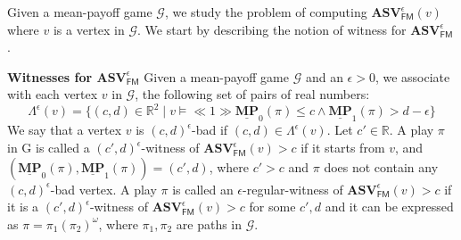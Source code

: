 Given a mean-payoff game $\mathcal{G}$, we study the problem of computing $\mathbf{ASV}^{\epsilon}_{\mathsf{FM}}(v)$ where $v$ is a vertex in $\mathcal{G}$. We start by describing the notion of witness for $\mathbf{ASV}^{\epsilon}_{\mathsf{FM}}$.

\noindent\textbf{Witnesses for $\mathbf{ASV}^{\epsilon}_{\mathsf{FM}}$} Given a mean-payoff game $\mathcal{G}$ and an $\epsilon > 0$, we associate with each vertex $v$ in $\mathcal{G}$, the following set of pairs of real numbers:
\begin{equation*}
\Lambda^{\epsilon}(v) = \{(c,d) \in \mathbb{R}^2 \mid v \models \ll 1 \gg \underline{\mathbf{MP}}_0(\pi) \leqslant c \land \underline{\mathbf{MP}}_1(\pi) > d-\epsilon \}
\end{equation*}
We say that a vertex $v$ is $(c,d)^{\epsilon}$-bad if $(c,d) \in \Lambda^{\epsilon}(v)$. Let $c' \in \mathbb{R}$.
A play $\pi$ in G is called a $(c',d)^{\epsilon}$-witness of $\mathbf{ASV}_{\mathsf{FM}}^{\epsilon}(v) > c$ if it starts from $v$, and $(\underline{\mathbf{MP}}_0(\pi), \underline{\mathbf{MP}}_1(\pi)) = (c', d)$, where $c' > c$ and $\pi$ does not contain any $(c,d)^{\epsilon}$-bad vertex. 
A play $\pi$ is called an $\epsilon$-regular-witness of $\mathbf{ASV}_{\mathsf{FM}}^{\epsilon}(v) > c$ if it is a $(c',d)^{\epsilon}$-witness of $\mathbf{ASV}_{\mathsf{FM}}^{\epsilon}(v) > c$ for some $c',d$ and it can be expressed as $\pi = \pi_1 (\pi_2)^{\omega}$, where $\pi_1, \pi_2$ are paths in $\mathcal{G}$.


